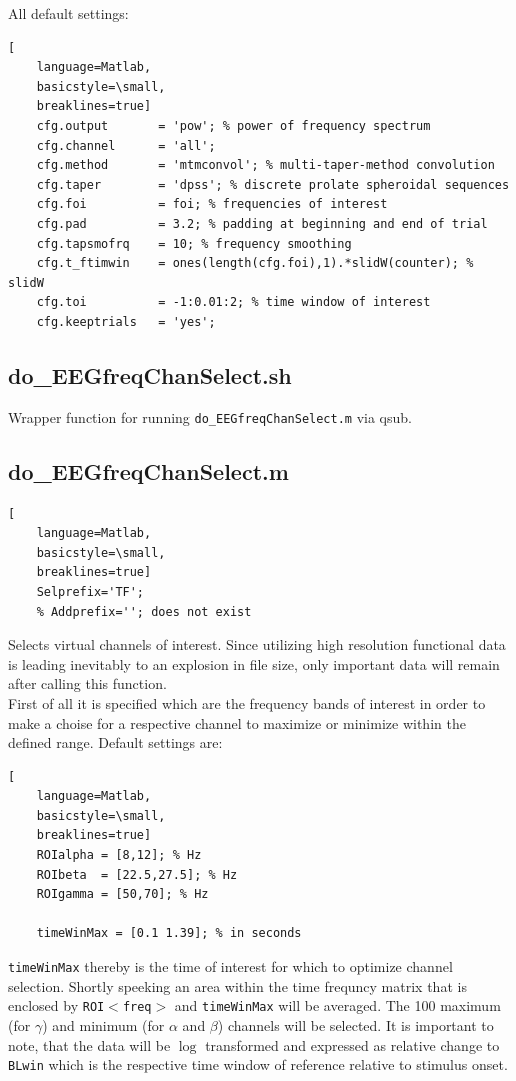 \documentclass[12pt,a4paper]{scrartcl}
\begin{document}
\noindent All default settings:
\begin{lstlisting}[
    language=Matlab,
    basicstyle=\small,
    breaklines=true]
    cfg.output       = 'pow'; % power of frequency spectrum
    cfg.channel      = 'all';
    cfg.method       = 'mtmconvol'; % multi-taper-method convolution
    cfg.taper        = 'dpss'; % discrete prolate spheroidal sequences
    cfg.foi          = foi; % frequencies of interest
    cfg.pad          = 3.2; % padding at beginning and end of trial
    cfg.tapsmofrq    = 10; % frequency smoothing
    cfg.t_ftimwin    = ones(length(cfg.foi),1).*slidW(counter); % slidW
    cfg.toi          = -1:0.01:2; % time window of interest
    cfg.keeptrials   = 'yes';
\end{lstlisting}

\subsection{do\_EEGfreqChanSelect.sh}
\label{sec:selchan}
Wrapper function for running \texttt{do\_EEGfreqChanSelect.m} via qsub.

\subsection{do\_EEGfreqChanSelect.m}
\begin{lstlisting}[
    language=Matlab,
    basicstyle=\small,
    breaklines=true]
    Selprefix='TF';
    % Addprefix=''; does not exist
\end{lstlisting}
Selects virtual channels of interest. Since utilizing high resolution functional data is leading inevitably to an explosion in file size, only important data will remain after calling this function.\\

\noindent First of all it is specified which are the frequency bands of interest in order to make a choise for a respective channel to maximize or minimize within the defined range. Default settings are:
\begin{lstlisting}[
    language=Matlab,
    basicstyle=\small,
    breaklines=true]
    ROIalpha = [8,12]; % Hz
    ROIbeta  = [22.5,27.5]; % Hz
    ROIgamma = [50,70]; % Hz

    timeWinMax = [0.1 1.39]; % in seconds
\end{lstlisting}

\texttt{timeWinMax} thereby is the time of interest for which to optimize channel selection. Shortly speeking an area within the time frequncy matrix that is enclosed by \texttt{ROI$<$freq$>$} and \texttt{timeWinMax} will be averaged. The 100 maximum (for $\gamma$) and minimum (for $\alpha$ and $\beta$) channels will be selected. It is important to note, that the data will be $\log$ transformed and expressed as relative change to \texttt{BLwin} which is the respective time window of reference relative to stimulus onset.
\end{document}
